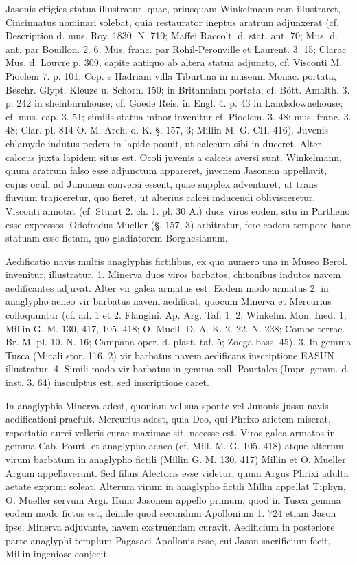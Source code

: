 \documentclass[landscape, a4paper, 11pt, oneside, polutonikogreek, german]{article}
\begin{document}
Jasonis effigies statua illustratur, quae, priusquam Winkelmann eam illustraret, Cincinnatus nominari solebat, quia restaurator ineptus aratrum adjunxerat (cf. Description d. mus. Roy. 1830. N. 710; Maffei Raccolt. d. stat. ant. 70; Mus. d. ant. par Bouillon. 2. 6; Mus. franc. par Rohil-Peronville et Laurent. 3. 15; Clarac Mus. d. Louvre p. 309, capite antiquo ab altera statua adjuncto, cf. Visconti M. Pioclem 7. p. 101; Cop. e Hadriani villa Tiburtina in museum Monac. portata, Beschr. Glypt. Kleuze u. Schorn. 150; in Britanniam portata; cf. Bött. Amalth. 3. p. 242 in shelnburnhouse; cf. Goede Reis. in Engl. 4. p. 43 in Landsdownehouse; cf. mus. cap. 3. 51; similis statua minor invenitur cf. Pioclem. 3. 48; mus. franc. 3. 48; Clar. pl. 814 O. M. Arch. d. K. §. 157, 3; Millin M. G. CII. 416). Juvenis chlamyde indutus pedem in lapide posuit, ut calceum sibi in duceret. Alter calceus juxta lapidem situs est. Ocoli juvenis a calceis aversi sunt. Winkelmann, quum aratrum falso esse adjunctum appareret, jnvenem Jasonem appellavit, cujus oculi ad Junonem conversi essent, quae supplex adventaret, ut trans fluvium trajiceretur, quo fieret, ut alterius calcei inducendi oblivisceretur. Visconti annotat (cf. Stuart 2. ch. 1. pl. 30 A.) duos viros eodem situ in Partheno esse expressos. Odofredus Mueller (§. 157, 3) arbitratur, fere eodem tempore hanc statuam esse fictam, quo gladiatorem Borghesianum.

Aedificatio navis multis anaglyphis fictilibus, ex quo numero una in Museo Berol. invenitur, illustratur. 1. Minerva duos viros barbatos, chitonibus indutos navem aedificantes adjuvat. Alter vir galea armatus est. Eodem modo armatus 2. in anaglypho aeneo vir barbatus navem aedificat, quocum Minerva et Mercurius colloquuntur (cf. ad. 1 et 2. Flangini. Ap. Arg. Taf. 1. 2; Winkelm. Mon. Ined. 1; Millin G. M. 130. 417, 105. 418; O. Muell. D. A. K. 2. 22. N. 238; Combe terrae. Br. M. pl. 10. N. 16; Campana oper. d. plast. taf. 5; Zoega bass. 45). 3. In gemma Tusca (Micali stor. 116, 2) vir barbatus navem aedificans inscriptione EASUN illustratur. 4. Simili modo vir barbatus in gemma coll. Pourtales (Impr. gemm. d. inst. 3. 64) insculptus est, sed inscriptione caret.

In anaglyphis Minerva adest, quoniam vel sua sponte vel Junonis jussu navis aedificationi praefuit. Mercurius adest, quia Deo, qui Phrixo arietem miserat, reportatio aurei velleris curae maximae sit, necesse est. Viros galea armatos in gemma Cab. Pourt. et anaglypho aeneo (cf. Mill. M. G. 105. 418) atque alterum virum barbatum in anaglypho fictili (Millin G. M. 130. 417) Millin et O. Mueller Argum appellaverunt. Sed filius Alectoris esse videtur, quum Argus Phrixi adulta aetate exprimi soleat. Alterum virum in anaglypho fictili Millin appellat Tiphyn, O. Mueller servum Argi. Hunc Jasonem appello primum, quod in Tusca gemma eodem modo fictus est, deinde quod secundum Apollonium 1. 724 etiam Jason ipse, Minerva adjuvante, navem exstruendam curavit. Aedificium in posteriore parte anaglyphi templum Pagasaei Apollonis esse, cui Jason sacrificium fecit, Millin ingeniose conjecit.
\end{document}
